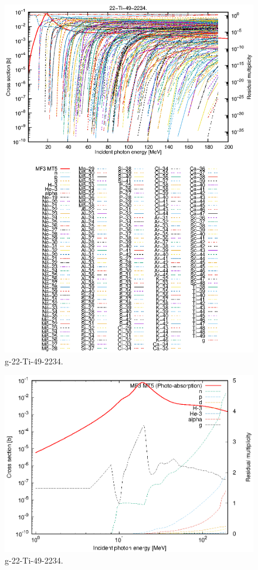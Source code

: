 \begin{figure}
 \includegraphics[width=\linewidth]{eps/g_22-Ti-49_2234.eps}
  \caption{g-22-Ti-49-2234.}
\end{figure}
\newpage \clearpage

\begin{figure}
 \includegraphics[width=\linewidth]{eps-log/g_22-Ti-49_2234.eps}
 \caption{g-22-Ti-49-2234.}
\end{figure}
\newpage \clearpage

